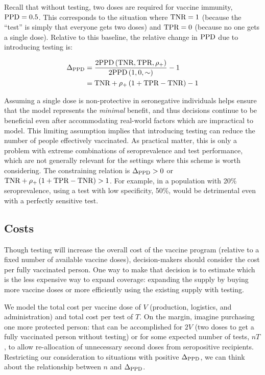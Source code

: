 \documentclass[10pt,a4paper,twocolumn]{article}
\begin{document}
Recall that without testing, two doses are required for vaccine immunity, \ie* $\textrm{PPD}=0.5$. This corresponds to the situation where $\textrm{TNR}=1$ (because the ``test'' is simply that everyone gets two doses) and $\textrm{TPR}=0$ (because no one gets a single dose). Relative to this baseline, the relative change in $\textrm{PPD}$ due to introducing testing is:

\begin{equation}\label{delppd}
\begin{aligned}
\Delta_{\textrm{PPD}} &= \frac{2\textrm{PPD}\left(\textrm{TNR},\textrm{TPR},\rho_{{+}}\right)}{2\textrm{PPD}\left(1,0,\sim\right)} - 1 \\
&= \textrm{TNR} + \rho_{{+}} \left(1 + \textrm{TPR}-\textrm{TNR}\right) - 1
\end{aligned}
\end{equation}

Assuming a single dose is non-protective in seronegative individuals helps ensure that the model represents the {\em minimal} benefit, and thus decisions continue to be beneficial even after accommodating real-world factors which are impractical to model. This limiting assumption implies that introducing testing can reduce the number of people effectively vaccinated. As practical matter, this is only a problem with extreme combinations of seroprevalence and test performance, which are not generally relevant for the settings where this scheme is worth considering. The constraining relation is $\Delta_{\textrm{PPD}} > 0$ or $\textrm{TNR} + \rho_{{+}} \left(1 + \textrm{TPR}-\textrm{TNR}\right) > 1$. For example, in a population with 20\% seroprevalence, using a test with low specificity, 50\%, would be detrimental even with a perfectly sensitive test.

\subsection*{Costs}

Though testing will increase the overall cost of the vaccine program (relative to a fixed number of available vaccine doses), decision-makers should consider the cost per fully vaccinated person. One way to make that decision is to estimate which is the less expensive way to expand coverage: expanding the supply by buying more vaccine doses or more efficiently using the existing supply with testing.

We model the total cost per vaccine dose of $V$ (\ie* production, logistics, and administration) and total cost per test of $T$. On the margin, imagine purchasing one more protected person: that can be accomplished for $2V$ (\ie* two doses to get a fully vaccinated person without testing) or for some expected number of tests, $nT$, to allow re-allocation of unnecessary second doses from seropositive recipients. Restricting our consideration to situations with positive $\Delta_{\textrm{PPD}}$, we can think about the relationship between $n$ and $\Delta_{\textrm{PPD}}$.
\end{document}
